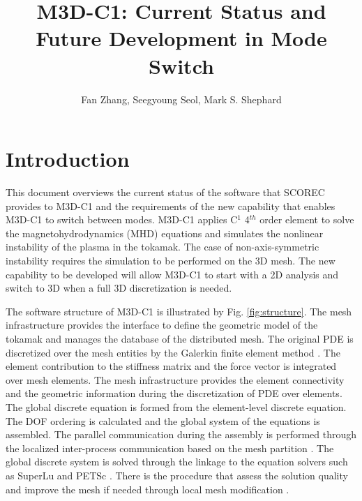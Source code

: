 \documentclass[11pt]{article}  %
\title{M3D-C1: Current Status and Future Development in Mode Switch}
\author{Fan Zhang, Seegyoung Seol, Mark S. Shephard}
\begin{document}
 
\maketitle

\tableofcontents
\clearpage
\section{Introduction}
This document overviews the current status of the software that SCOREC provides to M3D-C1 \cite{jardin2004triangular,jardin2007high,ferraro2009calculations,jardin2012review,jardin2012multiple, Ferraro2011, Ferraro2014} and the requirements of the new capability that enables M3D-C1 to switch between  modes. M3D-C1  applies C$^1$  4$^{th}$ order element to solve the magnetohydrodynamics (MHD) equations and simulates the nonlinear instability of the plasma in the tokamak.  The case of non-axis-symmetric instability requires the simulation to be performed on the 3D mesh.  The new  capability  to be developed will allow  M3D-C1  to start with a 2D analysis and switch to 3D when a full 3D discretization is needed.  

The software structure of M3D-C1 is illustrated by Fig. \ref{fig:structure}. The  mesh infrastructure \cite{pumi-web-page,Seol2014} provides the interface to define the geometric model of the tokamak and manages the database of the distributed mesh. The original PDE is discretized over the mesh entities by the Galerkin finite element method \cite{jardin2004triangular,jardin2007high,ferraro2009calculations,jardin2012review,jardin2012multiple}. The element contribution to the stiffness matrix and the force vector \cite{hughes2012finite} is integrated over mesh elements. The mesh infrastructure provides the element connectivity and the geometric information during the discretization of PDE over elements. The global discrete equation is formed from the element-level discrete equation. The DOF ordering is calculated and the global system of the equations is assembled. The parallel communication during the assembly is performed through the localized inter-process communication based on the mesh partition \cite{sahni2009strong,ovcharenko2012neighborhood}.  The global discrete system is solved through the linkage to the equation solvers such as SuperLu \cite{superlu_ug99} and PETSc \cite{petsc-web-page}. There is the procedure that assess the solution quality and improve the mesh if needed through local mesh modification \cite{li20053d,sahni2007automated, lu2013parallel}.
\end{document}
